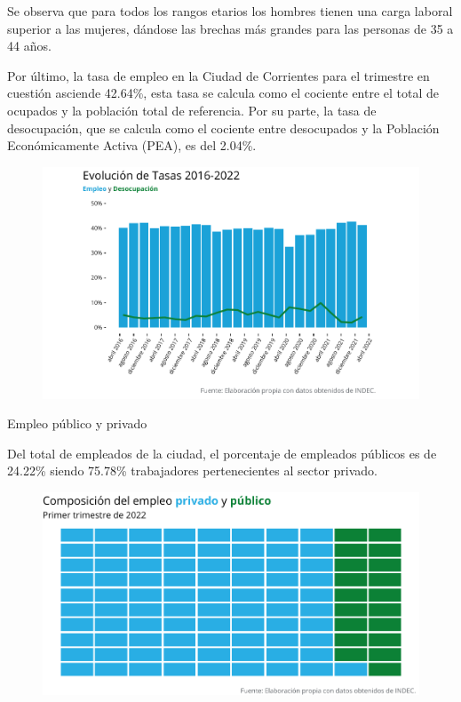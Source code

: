 \documentclass[
]{article}
\begin{document}
\newpage

Se observa que para todos los rangos etarios los hombres tienen una
carga laboral superior a las mujeres, dándose las brechas más grandes
para las personas de 35 a 44 años.

\newpage

Por último, la tasa de empleo en la Ciudad de Corrientes para el
trimestre en cuestión asciende 42.64\%, esta tasa se calcula como el
cociente entre el total de ocupados y la población total de referencia.
Por su parte, la tasa de desocupación, que se calcula como el cociente
entre desocupados y la Población Económicamente Activa (PEA), es del
2.04\%.

\begin{figure}[hbp]
\includegraphics{Informe-Mercado-Laboral_files/figure-latex/unnamed-chunk-22-1.pdf}
\caption{}
\end{figure}

\newpage

\textcolor{graycustom}{\Large Empleo público y privado} \newline

Del total de empleados de la ciudad, el porcentaje de empleados públicos
es de 24.22\% siendo 75.78\% trabajadores pertenecientes al sector
privado.

\begin{figure}[htp]
\includegraphics{Informe-Mercado-Laboral_files/figure-latex/unnamed-chunk-24-1.pdf}
\caption{}
\end{figure}
\end{document}

